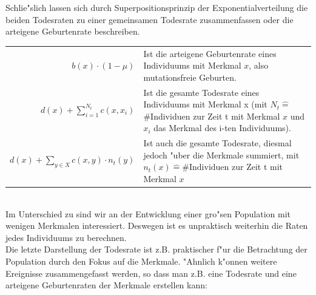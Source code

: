 \documentclass[11pt, a4paper, german]{article}
\theoremstyle{plain}
\begin{document}
	Schlie"slich lassen sich durch Superpositionsprinzip der Exponentialverteilung die beiden Todesraten zu einer gemeinsamen Todesrate zusammenfassen oder die arteigene Geburtenrate beschreiben.\\
	
	\begin{tabular}{ r p{18em} }
		$ b(x) \cdot (1 - \mu) $ & Ist die arteigene Geburtenrate eines Individuums mit Merkmal $ x $, also mutationsfreie Geburten.\\
		$ d(x) + \sum_{i=1}^{N_t} c(x, x_i) $ & Ist die gesamte Todesrate eines Individuums mit Merkmal x (mit $ N_t \hat{=} $ \#Individuen zur Zeit t mit Merkmal $ x $ und $ x_i $ das Merkmal des i-ten Individuums).\\
		$ d(x) + \sum_{y \in X} c(x,y) \cdot n_t(y) $ & Ist auch die gesamte Todesrate, diesmal jedoch "uber die Merkmale summiert, mit $ n_t(x) \hat{=} \text{\#Individuen}$ zur Zeit t mit Merkmal $ x $
	\end{tabular}\\
	
	Im Unterschied zu \cite{Champagnat20061127} sind wir an der Entwicklung einer gro"sen Population mit wenigen Merkmalen interessiert. Deswegen ist es unpraktisch weiterhin die Raten jedes Individuums zu berechnen.\\
	Die letzte Darstellung der Todesrate ist z.B. praktischer f"ur die Betrachtung der Population durch den Fokus auf die Merkmale. "Ahnlich k"onnen weitere Ereignisse zusammengefasst werden, so dass man z.B. eine Todesrate und eine arteigene Geburtenraten der Merkmale erstellen kann:
	
\end{document}
